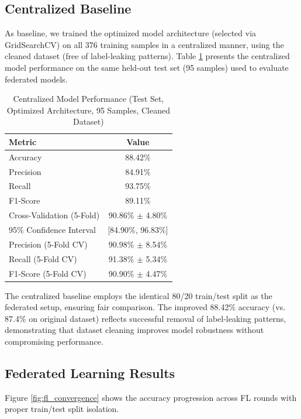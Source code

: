\documentclass[conference]{IEEEtran}
\begin{document}
\subsection{Centralized Baseline}

As baseline, we trained the optimized model architecture (selected via GridSearchCV) on all 376 training samples in a centralized manner, using the cleaned dataset (free of label-leaking patterns). Table \ref{tab:centralized} presents the centralized model performance on the same held-out test set (95 samples) used to evaluate federated models.

\begin{table}[h]
\centering
\caption{Centralized Model Performance (Test Set, Optimized Architecture, 95 Samples, Cleaned Dataset)}
\label{tab:centralized}
\begin{tabular}{@{}lc@{}}
\toprule
\textbf{Metric} & \textbf{Value} \\ \midrule
Accuracy & 88.42\% \\
Precision & 84.91\% \\
Recall & 93.75\% \\
F1-Score & 89.11\% \\
\midrule
Cross-Validation (5-Fold) & 90.86\% $\pm$ 4.80\% \\
95\% Confidence Interval & [84.90\%, 96.83\%] \\
Precision (5-Fold CV) & 90.98\% $\pm$ 8.54\% \\
Recall (5-Fold CV) & 91.38\% $\pm$ 5.34\% \\
F1-Score (5-Fold CV) & 90.90\% $\pm$ 4.47\% \\
\bottomrule
\end{tabular}
\end{table}

The centralized baseline employs the identical 80/20 train/test split as the federated setup, ensuring fair comparison. The improved 88.42\% accuracy (vs. 87.4\% on original dataset) reflects successful removal of label-leaking patterns, demonstrating that dataset cleaning improves model robustness without compromising performance.

\subsection{Federated Learning Results}

Figure \ref{fig:fl_convergence} shows the accuracy progression across FL rounds with proper train/test split isolation. 
\end{document}
